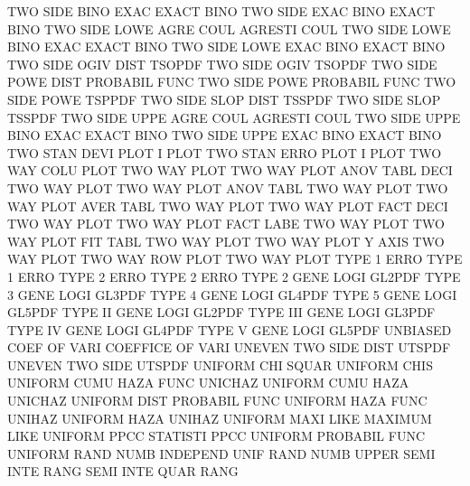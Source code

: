 TWO      SIDE BINO EXAC                 EXACT    BINO
TWO      SIDE EXAC BINO                 EXACT    BINO
TWO      SIDE LOWE AGRE COUL            AGRESTI  COUL
TWO      SIDE LOWE BINO EXAC            EXACT    BINO
TWO      SIDE LOWE EXAC BINO            EXACT    BINO
TWO      SIDE OGIV DIST                 TSOPDF
TWO      SIDE OGIV                      TSOPDF
TWO      SIDE POWE DIST                 PROBABIL FUNC
TWO      SIDE POWE                      PROBABIL FUNC
TWO      SIDE POWE                      TSPPDF
TWO      SIDE SLOP DIST                 TSSPDF
TWO      SIDE SLOP                      TSSPDF
TWO      SIDE UPPE AGRE COUL            AGRESTI  COUL
TWO      SIDE UPPE BINO EXAC            EXACT    BINO
TWO      SIDE UPPE EXAC BINO            EXACT    BINO
TWO      STAN DEVI PLOT                 I        PLOT
TWO      STAN ERRO PLOT                 I        PLOT
TWO      WAY  COLU PLOT                 TWO      WAY  PLOT
TWO      WAY  PLOT ANOV TABL DECI       TWO      WAY  PLOT
TWO      WAY  PLOT ANOV TABL            TWO      WAY  PLOT
TWO      WAY  PLOT AVER TABL            TWO      WAY  PLOT
TWO      WAY  PLOT FACT DECI            TWO      WAY  PLOT
TWO      WAY  PLOT FACT LABE            TWO      WAY  PLOT
TWO      WAY  PLOT FIT  TABL            TWO      WAY  PLOT
TWO      WAY  PLOT Y    AXIS            TWO      WAY  PLOT
TWO      WAY  ROW  PLOT                 TWO      WAY  PLOT
TYPE     1    ERRO                      TYPE     1    ERRO
TYPE     2    ERRO                      TYPE     2    ERRO
TYPE     2    GENE LOGI                 GL2PDF
TYPE     3    GENE LOGI                 GL3PDF
TYPE     4    GENE LOGI                 GL4PDF
TYPE     5    GENE LOGI                 GL5PDF
TYPE     II   GENE LOGI                 GL2PDF
TYPE     III  GENE LOGI                 GL3PDF
TYPE     IV   GENE LOGI                 GL4PDF
TYPE     V    GENE LOGI                 GL5PDF
UNBIASED COEF OF   VARI                 COEFFICE OF   VARI
UNEVEN   TWO  SIDE DIST                 UTSPDF
UNEVEN   TWO  SIDE                      UTSPDF
UNIFORM  CHI  SQUAR                     UNIFORM  CHIS
UNIFORM  CUMU HAZA FUNC                 UNICHAZ
UNIFORM  CUMU HAZA                      UNICHAZ
UNIFORM  DIST                           PROBABIL FUNC
UNIFORM  HAZA FUNC                      UNIHAZ
UNIFORM  HAZA                           UNIHAZ
UNIFORM  MAXI LIKE                      MAXIMUM  LIKE
UNIFORM  PPCC                           STATISTI PPCC
UNIFORM                                 PROBABIL FUNC
UNIFORM  RAND NUMB                      INDEPEND UNIF RAND NUMB
UPPER    SEMI INTE RANG                 SEMI     INTE QUAR RANG
